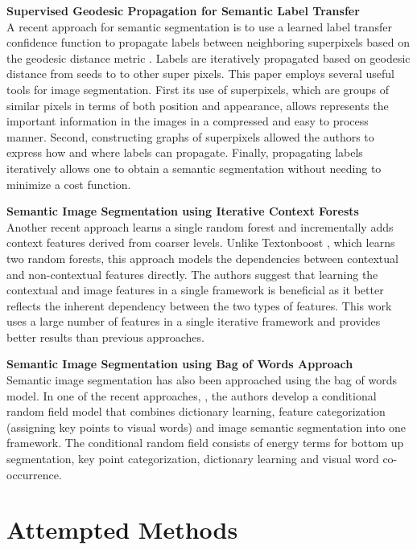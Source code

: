 \documentclass{article} %
\begin{document}
\textbf{Supervised Geodesic Propagation for Semantic Label Transfer} \hfill \\
\label{sec:Geo}
\noindent A recent approach for semantic segmentation is to use a learned label transfer confidence function to propagate labels between neighboring superpixels based on the geodesic distance metric \cite{Chen2012}. Labels are iteratively propagated based on geodesic distance from seeds to to other super pixels.
This paper employs several useful tools for image segmentation. First its use of superpixels, which are groups of similar pixels in terms of both position and appearance, allows represents the important information in the images in a compressed and easy to process manner. Second, constructing graphs of superpixels allowed the authors to express how and where labels can propagate. Finally, propagating labels iteratively allows one to obtain a semantic segmentation without needing to minimize a cost function.

\textbf{Semantic Image Segmentation using Iterative Context Forests} \hfill \\
\label{sec:RandFor}
\noindent Another recent approach learns a single random forest and incrementally adds context features derived from coarser levels. Unlike Textonboost \cite{Shotton06textonboost:joint}, which learns two random forests, this approach models the dependencies between contextual and non-contextual features directly. The authors suggest that learning the contextual and image features in a single framework is beneficial as it better reflects the inherent dependency between the two types of features. This work uses a large number of features in a single iterative framework and provides better results than previous approaches.

\textbf{Semantic Image Segmentation using Bag of Words Approach} \hfill \\
\label{sec:bagofwords}
\noindent Semantic image segmentation has also been approached using the bag of words model. In one of the recent approaches, \cite{visualdictrene}, the authors develop a conditional random field model that combines dictionary learning, feature categorization (assigning key points to visual words) and image semantic segmentation into one framework. The conditional random field consists of energy terms for bottom up segmentation, key point categorization, dictionary learning and visual word co-occurrence.

\section{Attempted Methods}
\label{sec:Attempt}
\end{document}
